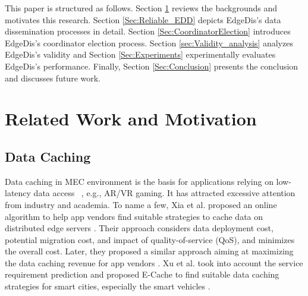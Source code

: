 \documentclass[10pt,journal,compsoc]{IEEEtran}
\begin{document}
This paper is structured as follows. Section \ref{Sec:Background_Motivation} reviews the backgrounds and motivates this research.  Section \ref{Sec:Reliable_EDD} depicts EdgeDis's data dissemination processes in detail. Section \ref{Sec:CoordinatorElection} introduces EdgeDis's coordinator election process. Section \ref{sec:Validity_analysis} analyzes EdgeDis's validity and Section \ref{Sec:Experiments} experimentally evaluates EdgeDis's performance.  Finally, Section \ref{Sec:Conclusion} presents the conclusion and discusses future work.




%
\section{Related Work and Motivation}
\label{Sec:Background_Motivation}


\subsection{Data Caching}
Data caching in MEC environment is the basis for applications relying on low-latency data access ~\cite{huang2019fair, xia2020online}, e.g., AR/VR gaming. It has attracted excessive attention from industry and academia. To name a few, Xia et al. proposed an online algorithm to help app vendors find suitable strategies to cache data on distributed edge servers \cite{xia2020online}. Their approach considers data deployment cost, potential migration cost, and impact of quality-of-service (QoS), and minimizes the overall cost. Later, they proposed a similar approach aiming at maximizing the data caching revenue for app vendors \cite{xia2021ol}. Xu et al. took into account the service requirement prediction and proposed E-Cache to find suitable data caching strategies for smart cities, especially the smart vehicles \cite{xu2021edge}.
\end{document}
